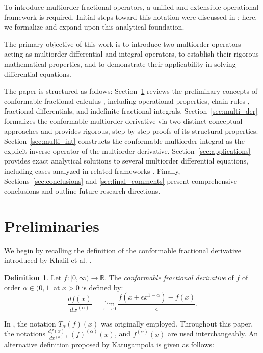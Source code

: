 \documentclass[oneside,10pt]{article}
\theoremstyle{plain}
\theoremstyle{definition}
\newtheorem{definition}[theorem]{Definition}
\begin{document}
To introduce multiorder fractional operators, a unified and extensible operational framework is required. Initial steps toward this notation were discussed in \cite{Cadenas2025}; here, we formalize and expand upon this analytical foundation.

The primary objective of this work is to introduce two multiorder operators acting as multiorder differential and integral operators, to establish their rigorous mathematical properties, and to demonstrate their applicability in solving differential equations.

The paper is structured as follows: Section~\ref{sec:preliminaries} reviews the preliminary concepts of conformable fractional calculus \cite{Katugampola2014, Khalil2014}, including operational properties, chain rules \cite{Atangana2015, Asbab2025}, fractional differentials, and indefinite fractional integrals. Section~\ref{sec:multi_der} formalizes the conformable multiorder derivative via two distinct conceptual approaches and provides rigorous, step-by-step proofs of its structural properties. Section~\ref{sec:multi_int} constructs the conformable multiorder integral as the explicit inverse operator of the multiorder derivative. Section~\ref{sec:applications} provides exact analytical solutions to several multiorder differential equations, including cases analyzed in related frameworks \cite{Abdeljawad2015, Kareem2017}. Finally, Sections~\ref{sec:conclusions} and \ref{sec:final_comments} present comprehensive conclusions and outline future research directions.

\section{Preliminaries}\label{sec:preliminaries}

We begin by recalling the definition of the conformable fractional derivative introduced by Khalil et al. \cite{Khalil2014}.

\begin{definition}\label{def:Khalil_der}
Let $f:[0,\infty) \to \mathbb{R}$. The \textit{conformable fractional derivative} of $f$ of order $\alpha \in (0,1]$ at $x > 0$ is defined by:
\begin{equation}\label{eq:conf_khalil}
\frac{df(x)}{dx^{(\alpha)}} = \lim_{\epsilon \to 0} \frac{f(x + \epsilon x^{1-\alpha}) - f(x)}{\epsilon}.
\end{equation}
\end{definition}

In \cite{Khalil2014}, the notation $T_\alpha(f)(x)$ was originally employed. Throughout this paper, the notations $\frac{df(x)}{dx^{(\alpha)}}$, $(f)^{(\alpha)}(x)$, and $f^{(\alpha)}(x)$ are used interchangeably. An alternative definition proposed by Katugampola \cite{Katugampola2014} is given as follows:
\end{document}
